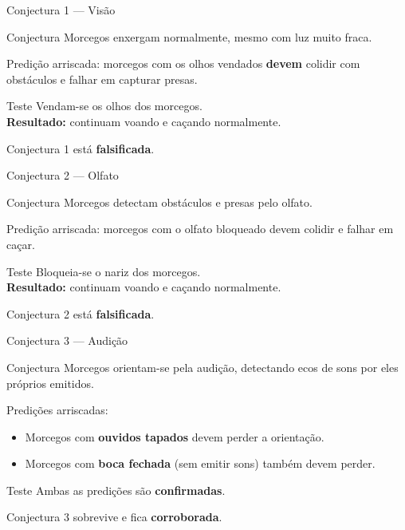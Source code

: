 \documentclass[aspectratio=169]{beamer}
\newcommand{\impt}[1]{\textcolor{maccent}{\textbf{#1}}}
\newcommand{\ntc}[1]{\textcolor{mprimary}{#1}}
\begin{document}
\begin{frame}{Conjectura 1 --- Visão}
\begin{block}{Conjectura}
Morcegos enxergam normalmente, mesmo com luz muito fraca.
\end{block}
\pause
\vspace{0.3cm}
\ntc{Predição arriscada:} morcegos com os olhos vendados \impt{devem} colidir com obstáculos e falhar em capturar presas.
\pause
\vspace{0.4cm}
\begin{alertblock}{Teste}
Vendam-se os olhos dos morcegos.\\
\impt{Resultado:} continuam voando e caçando normalmente.
\end{alertblock}
\pause
\vspace{0.3cm}
\ntc{Conjectura 1 está \impt{falsificada}.}
\end{frame}

\begin{frame}{Conjectura 2 --- Olfato}
\begin{block}{Conjectura}
Morcegos detectam obstáculos e presas pelo olfato.
\end{block}
\pause
\vspace{0.3cm}
\ntc{Predição arriscada:} morcegos com o olfato bloqueado devem colidir e falhar em caçar.
\pause
\vspace{0.4cm}
\begin{alertblock}{Teste}
Bloqueia-se o nariz dos morcegos.\\
\impt{Resultado:} continuam voando e caçando normalmente.
\end{alertblock}
\pause
\vspace{0.3cm}
\ntc{Conjectura 2 está \impt{falsificada}.}
\end{frame}

\begin{frame}{Conjectura 3 --- Audição}
\begin{block}{Conjectura}
Morcegos orientam-se pela audição, detectando ecos de sons por eles próprios emitidos.
\end{block}
\pause
\vspace{0.3cm}
\ntc{Predições arriscadas:}
\begin{itemize}
  \item Morcegos com \impt{ouvidos tapados} devem perder a orientação.
  \item Morcegos com \impt{boca fechada} (sem emitir sons) também devem perder.
\end{itemize}
\pause
\vspace{0.4cm}
\begin{alertblock}{Teste}
Ambas as predições são \impt{confirmadas}.
\end{alertblock}
\pause
\vspace{0.3cm}
\ntc{Conjectura 3 sobrevive e fica \impt{corroborada}.}
\end{frame}
\end{document}
